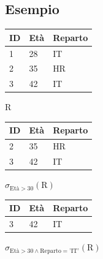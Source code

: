 \subsection{Esempio}
\begin{center}

    \begin{minipage}{0.4\textwidth}
        \centering
        \begin{tabular}{|l|l|l|}
        \hline
        \textbf{ID} & \textbf{Età} & \textbf{Reparto} \\ \hline
        1 & 28 & IT \\ \hline
        2 & 35 & HR \\ \hline
        3 & 42 & IT \\ \hline
        \end{tabular}
        
        \vspace{2mm}
        R
    \end{minipage}%
    \hfill
    \begin{minipage}{0.5\textwidth}
        \centering
        
        \begin{tabular}{|l|l|l|}
        \hline
        \textbf{ID} & \textbf{Età} & \textbf{Reparto} \\ \hline
        2 & 35 & HR \\ \hline
        3 & 42 & IT \\ \hline
        \end{tabular}
        
        \vspace{2mm}
        $\sigma_{\text{Età} > 30}(\text{R})$
        
        \vspace{1cm} %
        
        \begin{tabular}{|l|l|l|}
        \hline
        \textbf{ID} & \textbf{Età} & \textbf{Reparto} \\ \hline
        3 & 42 & IT \\ \hline
        \end{tabular}
        
        \vspace{2mm}
        $\sigma_{\text{Età} > 30 \land \text{Reparto} = \text{'IT'}}(\text{R})$
        
    \end{minipage}

\end{center}

